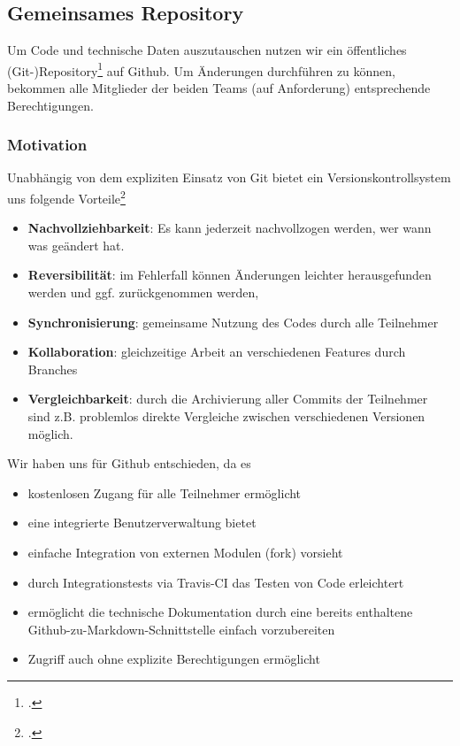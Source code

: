 \subsection{Gemeinsames Repository}
Um Code und technische Daten auszutauschen nutzen wir ein öffentliches (Git-)Repository\footcite{githubRepo} auf Github. Um Änderungen durchführen zu können, bekommen alle Mitglieder der beiden Teams (auf Anforderung) entsprechende Berechtigungen.

\subsubsection{Motivation}
Unabhängig von dem expliziten Einsatz von Git bietet ein Versionskontrollsystem uns folgende Vorteile\footcite{stackoverflowVersionControl}

\begin{itemize}
\item \textbf{Nachvollziehbarkeit}: Es kann jederzeit nachvollzogen werden, wer wann was geändert hat.
\item \textbf{Reversibilität}: im Fehlerfall können Änderungen leichter herausgefunden werden und ggf. zurückgenommen werden,
\item \textbf{Synchronisierung}: gemeinsame Nutzung des Codes durch alle Teilnehmer
\item \textbf{Kollaboration}: gleichzeitige Arbeit an verschiedenen Features durch Branches
\item \textbf{Vergleichbarkeit}: durch die Archivierung aller Commits der Teilnehmer sind z.B. problemlos direkte Vergleiche zwischen verschiedenen Versionen möglich.
\end{itemize}

Wir haben uns für Github entschieden, da es
\begin{itemize}
\item kostenlosen Zugang für alle Teilnehmer ermöglicht
\item eine integrierte Benutzerverwaltung bietet
\item einfache Integration von externen Modulen (fork) vorsieht
\item durch Integrationstests via Travis-CI das Testen von Code erleichtert
\item ermöglicht die technische Dokumentation durch eine bereits enthaltene Github-zu-Markdown-Schnittstelle einfach vorzubereiten
\item Zugriff auch ohne explizite Berechtigungen ermöglicht
\end{itemize}

